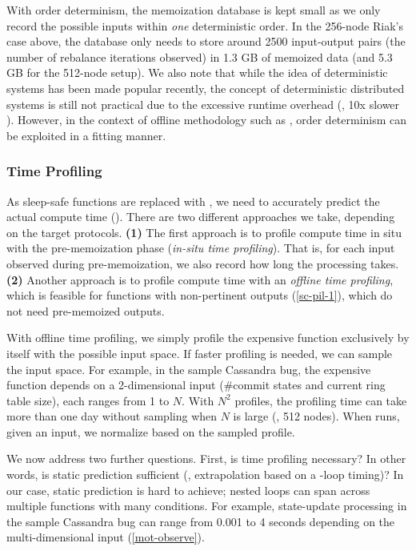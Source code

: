 %
With order determinism, the memoization database is kept small as we only
record the possible inputs within {\em one} deterministic order.  In the
256-node Riak's case above, the database only needs to store around 2500
input-output pairs (the number of rebalance iterations observed) in 1.3 GB
of memoized data (and 5.3 GB for the 512-node setup).
We also note that while the idea of deterministic systems has been made
popular recently,
the concept of deterministic distributed systems is still not practical
due to the excessive runtime overhead (\eg, 10x slower
\cite{Hunt+13-DDOS}).  However, in the context of offline methodology such
as \sck, order determinism can be exploited in a fitting manner.




\subsubsection{Time Profiling}
\label{sc-pil-4}



As sleep-safe functions are replaced with , we need to
accurately predict the actual compute time ().  There are two
different approaches we take, depending on the target protocols.
%
{\bf (1)} The first approach is to profile compute time in situ with
the pre-memoization phase ({\em in-situ time profiling}).  
That is, for each input observed during
pre-memoization, we also record how long the processing takes.
%
{\bf (2)} Another approach is to profile compute time with an {\em offline
time  profiling}, which is feasible for functions with non-pertinent outputs
(\sec\ref{sc-pil-1}), which do not need pre-memoized outputs.  

With offline time profiling, we simply profile the expensive function
exclusively by itself with the possible input space.
If faster profiling is needed, we can sample the input space.
For example, in the sample Cassandra bug,
the expensive function depends on a 2-dimensional input (\#commit states
and current ring table size), each ranges from 1 to $N$.  
With $N^2$ profiles, the profiling time can
take more than 
one day without sampling when $N$ is large (\eg, 512 nodes).  When \sck
runs, given an input, we normalize  based on the sampled profile.

We now address two further questions.  First, is time profiling necessary?
In other words, is static prediction sufficient (\eg, extrapolation based
on a -loop timing)?  In our case, static prediction is hard
to achieve; nested loops can span across multiple functions with many
 conditions.  For example, state-update processing in
the sample Cassandra bug can range from 0.001 to 4 seconds depending on the
multi-dimensional input (\sec\ref{mot-observe}).  
%

